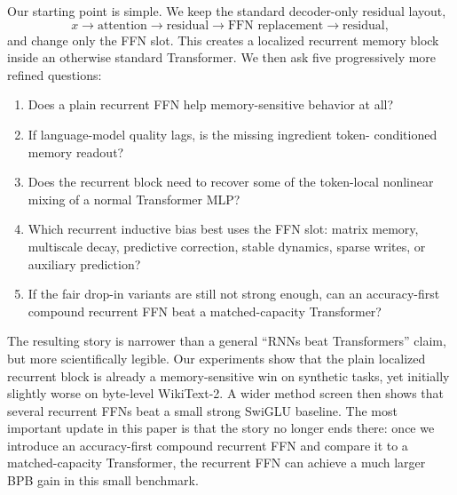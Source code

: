 \documentclass[11pt]{article}
\begin{document}
Our starting point is simple. We keep the standard decoder-only residual
layout,
\[
x \rightarrow \text{attention} \rightarrow \text{residual} \rightarrow
\text{FFN replacement} \rightarrow \text{residual},
\]
and change only the FFN slot. This creates a localized recurrent memory block
inside an otherwise standard Transformer. We then ask five progressively more
refined questions:
\begin{enumerate}[leftmargin=1.25em]
  \item Does a plain recurrent FFN help memory-sensitive behavior at all?
  \item If language-model quality lags, is the missing ingredient token-
  conditioned memory readout?
  \item Does the recurrent block need to recover some of the token-local
  nonlinear mixing of a normal Transformer MLP?
  \item Which recurrent inductive bias best uses the FFN slot: matrix memory,
  multiscale decay, predictive correction, stable dynamics, sparse writes, or
  auxiliary prediction?
  \item If the fair drop-in variants are still not strong enough, can an
  accuracy-first compound recurrent FFN beat a matched-capacity Transformer?
\end{enumerate}

The resulting story is narrower than a general ``RNNs beat Transformers''
claim, but more scientifically legible. Our experiments show that the plain
localized recurrent block is already a memory-sensitive win on synthetic tasks,
yet initially slightly worse on byte-level WikiText-2. A wider method screen
then shows that several recurrent FFNs beat a small strong SwiGLU baseline. The
most important update in this paper is that the story no longer ends there:
once we introduce an accuracy-first compound recurrent FFN and compare it to a
matched-capacity Transformer, the recurrent FFN can achieve a much larger BPB
gain in this small benchmark.
\end{document}
